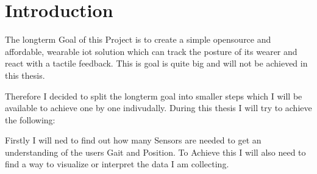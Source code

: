 \chapter*{Introduction}
\label{chap:Introduction}
\renewcommand{\thesection}{\arabic{section}}
\setcounter{section}{0}

The longterm Goal of this Project is to create a simple opensource and affordable, wearable iot solution which can track the posture of its wearer and react with a tactile feedback. This is goal is quite big and will not be achieved in this thesis. 

Therefore I decided to split the longterm goal into smaller steps which I will be available to achieve one by one indivudally. During this thesis I will try to achieve the following:

Firstly I will ned to find out how many Sensors are needed to get an understanding of the users Gait and Position. To Achieve this I will also need to find a way to visualize or interpret the data I am collecting.
